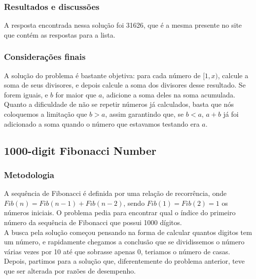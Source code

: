 \documentclass{article}
\begin{document}
        \subsubsection{Resultados e discussões}
        A resposta encontrada nessa solução foi 31626, que é a mesma presente no site que contém as respostas para a lista.
        
        \subsubsection{Considerações finais}
        A solução do problema é bastante objetiva: para cada número de $[1, x)$, calcule a soma de seus divisores, e depois calcule a soma dos divisores desse resultado. Se forem iguais, e $b$ for maior que $a$, adicione a soma deles na soma acumulada.\\
        Quanto a dificuldade de não se repetir números já calculados, basta que nós coloquemos a limitação que $b > a$, assim garantindo que, se $b < a$, $a + b$ já foi adicionado a soma quando o número que estavamos testando era $a$.

    \subsection{1000-digit Fibonacci Number}
        
        \subsubsection{Metodologia}
        A sequência de Fibonacci é definida por uma relação de recorrência, onde $Fib(n) = Fib(n - 1) + Fib(n - 2)$, sendo $Fib(1) = Fib(2) = 1$ os números iniciais.
        O problema pedia para encontrar qual o índice do primeiro número da sequência de Fibonacci que possui 1000 dígitos.\\
        A busca pela solução começou pensando na forma de calcular quantos digitos tem um número, e rapidamente chegamos a conclusão que se dividissemos o número várias vezes por 10 até que sobrasse apenas 0, teriamos o número de casas. Depois, partimos para a solução que, diferentemente do problema anterior, teve que ser alterada por razões de desempenho.
        
\end{document}
